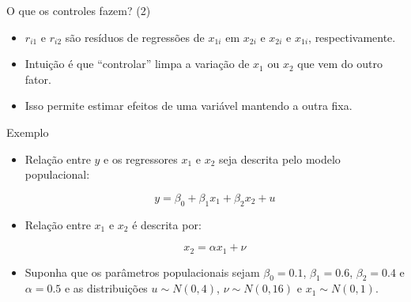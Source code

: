 \documentclass[10pt,slides,xcolor=pdftex,dvipsnames,table]{beamer}
\begin{document}

\begin{frame}{O que os controles fazem? (2)}
    
     \begin{itemize}\itemsep1.2em   
     
     \item $r_{i1}$ e $r_{i2}$ são resíduos de regressões de $x_{1i}$ em $x_{2i}$ e $x_{2i}$ e $x_{1i}$, respectivamente. 
     
     \item Intuição é que ``controlar'' limpa a variação de $x_1$ ou $x_2$ que vem do outro fator. 
     
     \item Isso permite estimar efeitos de uma variável mantendo a outra fixa. 
     
    \end{itemize}
    
\end{frame}


\begin{frame}{Exemplo}

\begin{itemize}\itemsep1.2em

\item Relação entre $y$ e os regressores $x_1$ e $x_2$ seja descrita pelo modelo populacional:

$$ y = \beta_0 + \beta_1 x_1 + \beta_2 x_2 + u $$

\item Relação entre $x_1$ e $x_2$ é descrita por:

$$ x_2 = \alpha x_1 + \nu $$

\item Suponha que os parâmetros populacionais sejam $\beta_0 = 0.1$, $\beta_1 = 0.6$, $\beta_2 = 0.4$ e $\alpha = 0.5$ e as distribuições $u \sim N(0,4)$, $\nu \sim N(0,16)$ e $x_1 \sim N(0,1)$.

\end{itemize}

\end{frame}

\end{document}
